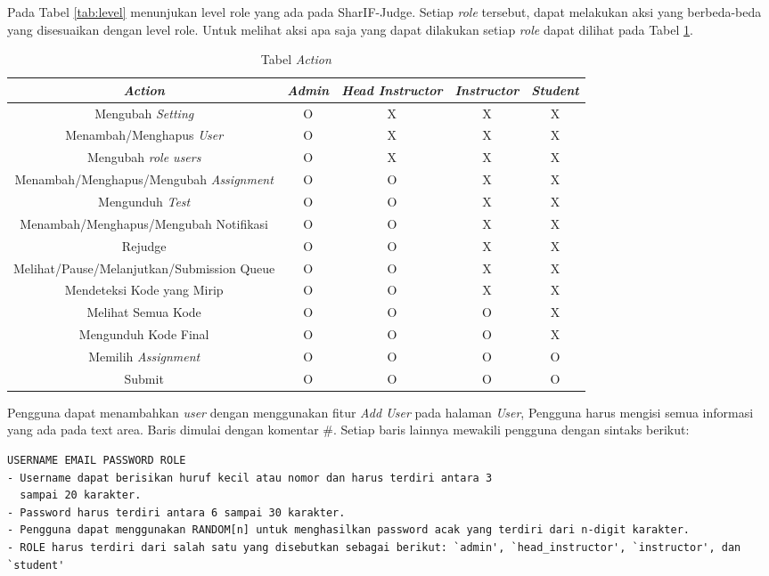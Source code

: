 \begin{itemize}
        Pada Tabel \ref{tab:level} menunjukan level role yang ada pada SharIF-Judge. Setiap \textit{role} tersebut, dapat melakukan aksi yang berbeda-beda yang disesuaikan dengan level role. Untuk melihat aksi apa saja yang dapat dilakukan setiap \textit{role} dapat dilihat pada Tabel \ref{tab:aksi}.
    \begin{table}[H]
	    \centering 
	    \caption{Tabel \textit{Action}}
	    \label{tab:aksi}
	    \begin{tabular}{|c|c|c|c|c|}
		    \hline
		    \textit{Action} & \textit{Admin} & \textit{Head Instructor} & \textit{Instructor} & \textit{Student} \\
		    \hline
		    Mengubah \textit{Setting} & O & X & X & X \\
		    \hline
		    Menambah/Menghapus \textit{User} & O & X & X & X \\
		    \hline
		    Mengubah \textit{role users} & O & X & X & X \\
		    \hline
		    Menambah/Menghapus/Mengubah \textit{Assignment} & O & O & X & X \\
		    \hline
		    Mengunduh \textit{Test} & O & O & X & X \\
		    \hline
		    Menambah/Menghapus/Mengubah Notifikasi & O & O & X & X \\
		    \hline
		    Rejudge & O & O & X & X \\
		    \hline
		    Melihat/Pause/Melanjutkan/Submission Queue & O & O & X & X \\
		    \hline
		    Mendeteksi Kode yang Mirip  & O & O & X & X \\
		    \hline
		    Melihat Semua Kode  & O & O & O & X \\
		    \hline
		    Mengunduh Kode Final  & O & O & O & X \\
		    \hline
		    Memilih \textit{Assignment}   & O & O & O & O \\
		    \hline
		    Submit  & O & O & O & O \\
		    \hline
	    \end{tabular} 
    \end{table}
        Pengguna dapat menambahkan \textit{user} dengan menggunakan fitur \textit{Add User} pada halaman \textit{User}, Pengguna harus mengisi semua informasi yang ada pada text area. Baris dimulai dengan komentar
\#. Setiap baris lainnya mewakili pengguna dengan sintaks berikut:

     \begin{lstlisting}[basicstyle=\ttfamily, frame=single,
        columns=fullflexible, breaklines=true, numbers=none]
USERNAME EMAIL PASSWORD ROLE
- Username dapat berisikan huruf kecil atau nomor dan harus terdiri antara 3 
  sampai 20 karakter.
- Password harus terdiri antara 6 sampai 30 karakter.
- Pengguna dapat menggunakan RANDOM[n] untuk menghasilkan password acak yang terdiri dari n-digit karakter.
- ROLE harus terdiri dari salah satu yang disebutkan sebagai berikut: `admin', `head_instructor', `instructor', dan `student'
    \end{lstlisting}
    

\end{itemize}
